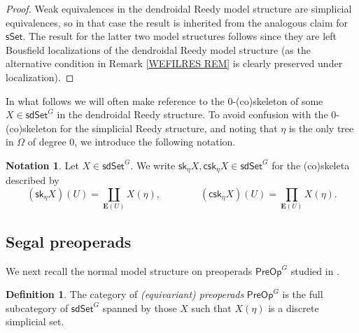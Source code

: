 \documentclass[a4paper,10pt
,draft
]{article}%
\numberwithin{equation}{section}
\numberwithin{figure}{section}
\theoremstyle{definition} %
\newtheorem{definition}[equation]{Definition}%
\newtheorem{notation}[equation]{Notation}%
\newcommand{\1}{\ensuremath{\mathbbm 1}}%
\begin{document}
\begin{proof}
	Weak equivalences in the dendroidal Reedy model structure are simplicial equivalences, 
	so in that case the result is inherited from the analogous claim for $\mathsf{sSet}$.
%	
	The result for the latter two model structures follows
	since they are left Bousfield localizations of the dendroidal Reedy model structure
	(as the alternative condition in
	Remark \ref{WEFILRES REM}
	is clearly preserved under localization).
\end{proof}




In what follows we will often make reference
to the $0$-(co)skeleton
of some $X \in \mathsf{sdSet}^G$
in the dendroidal Reedy structure.
To avoid confusion with the
$0$-(co)skeleton for the simplicial Reedy structure,
and noting that $\eta$ is the only tree in $\Omega$
of degree $0$, we introduce the following notation.




\begin{notation}
Let $X \in \mathsf{sdSet}^G$.
We write
$\mathsf{sk}_{\eta}X,\mathsf{csk}_{\eta}X \in \mathsf{sdSet}^G$
for the (co)skeleta described by
\[
	\left(\mathsf{sk}_{\eta} X\right)(U) =
	\coprod_{\boldsymbol{E}(U)} X(\eta),
\qquad \qquad
	\left(\mathsf{csk}_{\eta} X\right)(U) = 
	\prod_{\boldsymbol{E}(U)} X(\eta).
\]
\end{notation}




\subsection{Segal preoperads}
\label{SPREOP_SEC}


We next recall the normal model structure on preoperads
$\mathsf{PreOp}^G$
studied in \cite[\S 4, \S 5]{BP_edss}.


\begin{definition}\label{PREOP DEF} 
	The category of \textit{(equivariant) preoperads} $\mathsf{PreOp}^G$ is the full subcategory of $\mathsf{sdSet}^G$ spanned by those $X$ such that
	$X(\eta)$ is a discrete simplicial set.
\end{definition}
\end{document}
